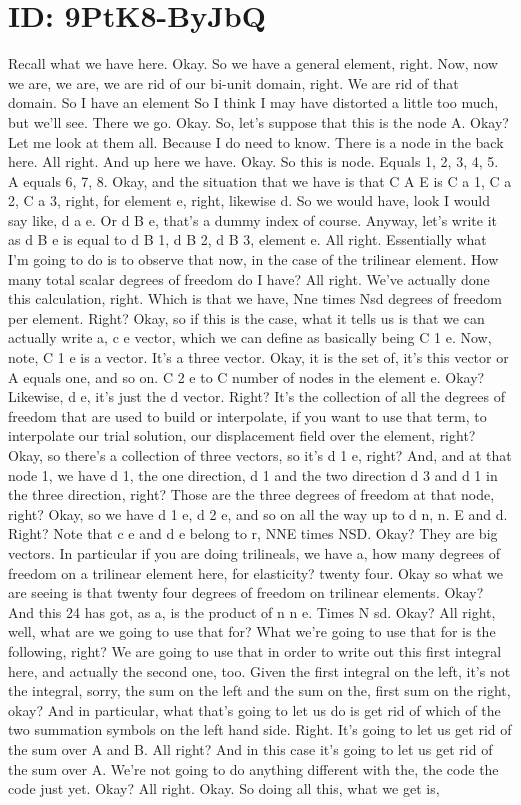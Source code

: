 \documentclass[10pt]{article}
\begin{document}
\section*{ID: 9PtK8-ByJbQ}
Recall what we have here. Okay. So we have a general element, right. Now, now we are, we are, we are rid of our bi-unit domain, right. We are rid of that domain. So I have an element So I think I may have distorted a little too much, but we'll see. There we go. Okay. So, let's suppose that this is the node A. Okay? Let me look at them all. Because I do need to know. There is a node in the back here. All right. And up here we have. Okay. So this is node. Equals 1, 2, 3, 4, 5. A equals 6, 7, 8. Okay, and the situation that we have is that C A E is C a 1, C a 2, C a 3, right, for element e, right, likewise d. So we would have, look I would say like, d a e. Or d B e, that's a dummy index of course. Anyway, let's write it as d B e is equal to d B 1, d B 2, d B 3, element e. All right. Essentially what I'm going to do is to observe that now, in the case of the trilinear element. How many total scalar degrees of freedom do I have? All right. We've actually done this calculation, right. Which is that we have, Nne times Nsd degrees of freedom per element. Right? Okay, so if this is the case, what it tells us is that we can actually write a, c e vector, which we can define as basically being C 1 e. Now, note, C 1 e is a vector. It's a three vector. Okay, it is the set of, it's this vector or A equals one, and so on. C 2 e to C number of nodes in the element e. Okay? Likewise, d e, it's just the d vector. Right? It's the collection of all the degrees of freedom that are used to build or interpolate, if you want to use that term, to interpolate our trial solution, our displacement field over the element, right? Okay, so there's a collection of three vectors, so it's d 1 e, right? And, and at that node 1, we have d 1, the one direction, d 1 and the two direction d 3 and d 1 in the three direction, right? Those are the three degrees of freedom at that node, right? Okay, so we have d 1 e, d 2 e, and so on all the way up to d n, n. E and d. Right? Note that c e and d e belong to r, NNE times NSD. Okay? They are big vectors. In particular if you are doing trilineals, we have a, how many degrees of freedom on a trilinear element here, for elasticity? twenty four. Okay so what we are seeing is that twenty four degrees of freedom on trilinear elements. Okay? And this 24 has got, as a, is the product of n n e. Times N sd. Okay? All right, well, what are we going to use that for? What we're going to use that for is the following, right? We are going to use that in order to write out this first integral here, and actually the second one, too. Given the first integral on the left, it's not the integral, sorry, the sum on the left and the sum on the, first sum on the right, okay? And in particular, what that's going to let us do is get rid of which of the two summation symbols on the left hand side. Right. It's going to let us get rid of the sum over A and B. All right? And in this case it's going to let us get rid of the sum over A. We're not going to do anything different with the, the code the code just yet. Okay? All right. Okay. So doing all this, what we get is, 
\end{document}
